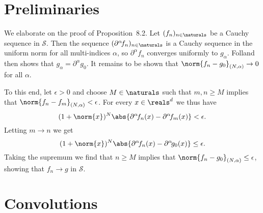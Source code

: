 \documentclass[article, a4paper, 11pt, oneside]{memoir}
\numberwithin{equation}{chapter}
\theoremstyle{nonumberplain}
\begin{document}
\section{Preliminaries}

\newcommand{\calS}{\mathcal{S}}
\newcommand{\schwartz}{\calS}

\begin{remarkbreak}
	We elaborate on the proof of Proposition~8.2. Let $(f_n)_{n\in\naturals}$ be a Cauchy sequence in $\schwartz$. Then the sequence $(\partial^\alpha \!f_n)_{n\in\naturals}$ is a Cauchy sequence in the uniform norm for all multi-indices $\alpha$, so $\partial^\alpha \!f_n$ converges uniformly to $g_\alpha$. Folland then shows that $g_\alpha = \partial^\alpha \!g_0$. It remains to be shown that $\norm{f_n - g_0}_{(N,\alpha)} \to 0$ for all $\alpha$.

	To this end, let $\epsilon > 0$ and choose $M \in \naturals$ such that $m,n \geq M$ implies that $\norm{f_n - f_m}_{(N,\alpha)} < \epsilon$. For every $x \in \reals^d$ we thus have
	\begin{equation*}
		(1 + \norm{x})^N \abs{\partial^\alpha \!f_n(x) - \partial^\alpha \!f_m(x)}
			< \epsilon.
	\end{equation*}
	Letting $m \to n$ we get
	\begin{equation*}
		(1 + \norm{x})^N \abs{\partial^\alpha \!f_n(x) - \partial^\alpha \!g_0(x)}
			\leq \epsilon.
	\end{equation*}
	Taking the supremum we find that $n \geq M$ implies that $\norm{f_n - g_0}_{(N,\alpha)} \leq \epsilon$, showing that $f_n \to g$ in $\schwartz$.
\end{remarkbreak}


\section{Convolutions}
\end{document}
